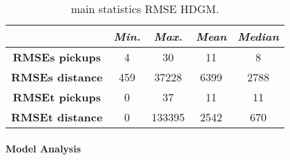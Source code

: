 \begin{table}[h!]
	\centering
	\renewcommand\arraystretch{1.3}
	\begin{tabular}{c|c|c|c|c|}
		\hline
		\textit{} & \textit{Min.} & \textit{Max.} & \textit{Mean} & \textit{Median} \\
		\hline
		\textbf{RMSEs pickups} & 4 & 30 & 11 & 8 \\
		\hline
		\textbf{RMSEs distance} & 459 & 37228 & 6399 & 2788 \\
		\hline
		\textbf{RMSEt pickups} & 0 & 37 & 11 & 11 \\
		\hline
		\textbf{RMSEt distance} & 0 & 133395 & 2542 & 670\\
		\hline
	\end{tabular}
	\caption{main statistics RMSE HDGM.}
	\label{RMSE_HDGM_stats}
\end{table}
\paragraph{Model Analysis} 
